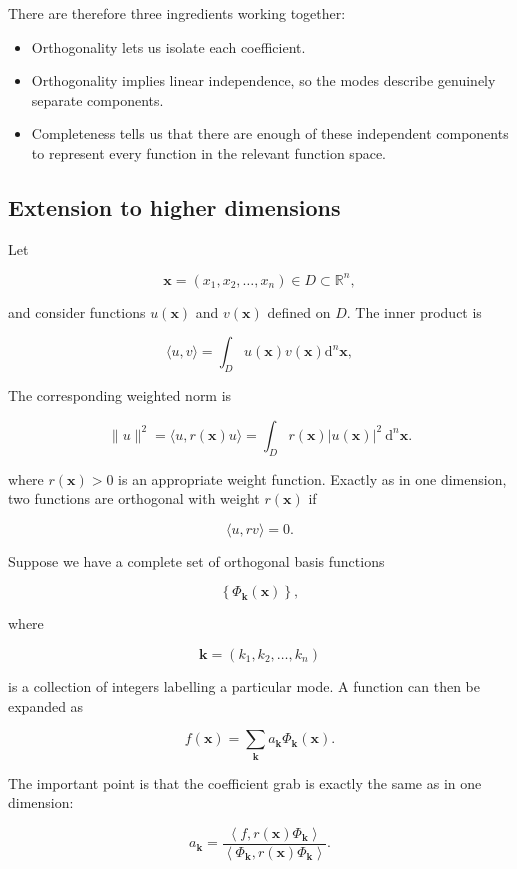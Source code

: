 \begin{remark}
  There are therefore three ingredients working together:
\begin{itemize}
\item[1.] Orthogonality lets us isolate each coefficient.
\item[2.] Orthogonality implies linear independence, so the modes describe genuinely separate components.
\item[3.] Completeness tells us that there are enough of these independent components to represent every function in the relevant function space.
\end{itemize}
\end{remark}

\subsection{Extension to higher dimensions}

\begin{theorem}
  Let

\[
\mathbf{x}=\left(x_1, x_2, \ldots, x_n\right) \in D \subset \mathbb{R}^n,
\]

and consider functions \(u(\mathbf{x})\) and \(v(\mathbf{x})\) defined on \(D\).
The inner product is

\[
\langle u, v\rangle=\int_D u(\mathbf{x}) v(\mathbf{x}) \mathrm{d}^n \mathbf{x},
\]

The corresponding weighted norm is

\[
\|u\|^2=\langle u, r(\mathbf{x}) u\rangle=\int_D r(\mathbf{x})|u(\mathbf{x})|^2 \mathrm{~d}^n \mathbf{x} .
\]

where \(r(\mathbf{x})>0\) is an appropriate weight function. Exactly as in one dimension, two functions are orthogonal with weight \(r(\mathbf{x})\) if

\[
\langle u, r v\rangle=0 .
\]

Suppose we have a complete set of orthogonal basis functions

\[
\left\{\Phi_{\mathbf{k}}(\mathbf{x})\right\},
\]

where

\[
\mathbf{k}=\left(k_1, k_2, \ldots, k_n\right)
\]

is a collection of integers labelling a particular mode.
A function can then be expanded as

\[
f(\mathbf{x})=\sum_{\mathbf{k}} a_{\mathbf{k}} \Phi_{\mathbf{k}}(\mathbf{x}) .
\]

The important point is that the coefficient grab is exactly the same as in one dimension:

\[
a_{\mathbf{k}}=\frac{\left\langle f, r(\mathbf{x}) \Phi_{\mathbf{k}}\right\rangle}{\left\langle\Phi_{\mathbf{k}}, r(\mathbf{x}) \Phi_{\mathbf{k}}\right\rangle} .
\]
\end{theorem}

